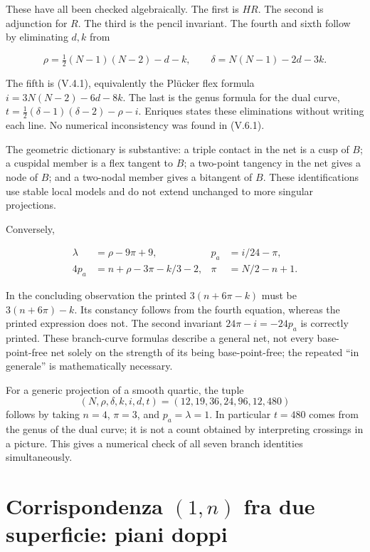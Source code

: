 These have all been checked algebraically. The first is \(HR\). The second is adjunction for \(R\). The third is the pencil invariant. The fourth and sixth follow by eliminating \(d,k\) from

\[
\rho=\tfrac12(N-1)(N-2)-d-k,
\qquad \delta=N(N-1)-2d-3k.
\]

The fifth is (V.4.1), equivalently the Plücker flex formula \(i=3N(N-2)-6d-8k\). The last is the genus formula for the dual curve, \(t=\tfrac12(\delta-1)(\delta-2)-\rho-i\). Enriques states these eliminations without writing each line. No numerical inconsistency was found in (V.6.1).

The geometric dictionary is substantive: a triple contact in the net is a cusp of \(B\); a cuspidal member is a flex tangent to \(B\); a two-point tangency in the net gives a node of \(B\); and a two-nodal member gives a bitangent of \(B\). These identifications use stable local models and do not extend unchanged to more singular projections.

Conversely,

\[
\begin{aligned}
\lambda&=\rho-9\pi+9,& p_a&=i/24-\pi,\\
4p_a&=n+\rho-3\pi-k/3-2,& \pi&=N/2-n+1.
\end{aligned}
\]

In the concluding observation the printed \(3(n+6\pi-k)\) must be \(3(n+6\pi)-k\). Its constancy follows from the fourth equation, whereas the printed expression does not. The second invariant \(24\pi-i=-24p_a\) is correctly printed. These branch-curve formulas describe a general net, not every base-point-free net solely on the strength of its being base-point-free; the repeated ``in generale'' is mathematically necessary.

\begin{example}
For a generic projection of a smooth quartic, the tuple
\[
(N,\rho,\delta,k,i,d,t)=(12,19,36,24,96,12,480)
\]
follows by taking $n=4$, $\pi=3$, and $p_a=\lambda=1$.
In particular $t=480$ comes from the genus of the dual curve; it is not a
count obtained by interpreting crossings in a picture. This gives a numerical
check of all seven branch identities simultaneously.
\end{example}

\section[Corrispondenze e piani doppi]{Corrispondenza \texorpdfstring{$(1,n)$}{(1,n)} fra due superficie: piani doppi}
\label{cp1-v-7}

